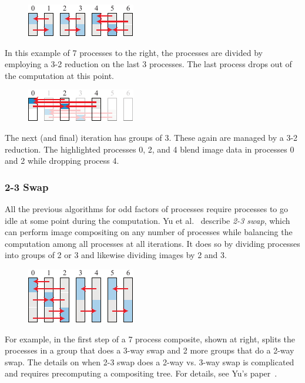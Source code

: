 \documentclass{vgtc}                          %
\newcommand*{\lcite}[1]{~\cite{#1}}
\newcommand*{\scite}[1]{~\cite{#1}}
\newcommand{\etal}{et al.\xspace}
\newcommand*{\keyterm}[1]{\emph{#1}}
\newcommand{\textalgorithm}[1]{\textsf{#1}\xspace}
\newcommand{\ttswap}{\textalgorithm{2-3 swap}}
\begin{document}
\begin{figure}
  \includegraphics[scale=.75]{remainder-1}
\end{figure}
In this example of 7 processes to the right, the processes are divided by employing a 3-2 reduction on the last 3 processes.
The last process drops out of the computation at this point.

\begin{figure}
  \includegraphics[scale=.75]{remainder-2}
\end{figure}
The next (and final) iteration has groups of 3.
These again are managed by a 3-2 reduction.
The highlighted processes 0, 2, and 4 blend image data in processes 0 and 2 while dropping process 4.

\subsubsection{2-3 Swap}

All the previous algorithms for odd factors of processes require processes to go idle at some point during the computation.
Yu \etal\scite{23Swap} describe \keyterm{\ttswap}, which can perform image compositing on any number of processes while balancing the computation among all processes at all iterations.
It does so by dividing processes into groups of 2 or 3 and likewise dividing images by 2 and 3.

\begin{figure}
  \includegraphics[scale=.75]{2-3-swap-1}
\end{figure}
For example, in the first step of a 7 process composite, shown at right, splits the processes in a group that does a 3-way swap and 2 more groups that do a 2-way swap.
The details on when \ttswap does a 2-way vs. 3-way swap is complicated and requires precomputing a compositing tree.
For details, see Yu's paper\lcite{23Swap}.
\end{document}
